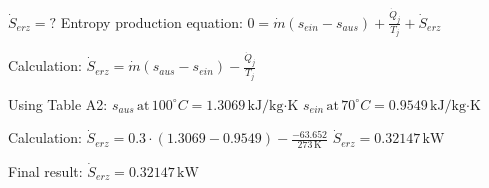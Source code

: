 \( \dot{S}_{erz} = ? \)  
Entropy production equation:  
\( 0 = \dot{m} (s_{ein} - s_{aus}) + \frac{\dot{Q}_j}{T_j} + \dot{S}_{erz} \)  

Calculation:  
\( \dot{S}_{erz} = \dot{m} (s_{aus} - s_{ein}) - \frac{\dot{Q}_j}{T_j} \)  

Using Table A2:  
\( s_{aus} \, \text{at} \, 100^\circ C = 1.3069 \, \text{kJ/kg·K} \)  
\( s_{ein} \, \text{at} \, 70^\circ C = 0.9549 \, \text{kJ/kg·K} \)  

Calculation:  
\( \dot{S}_{erz} = 0.3 \cdot (1.3069 - 0.9549) - \frac{-63.652}{273 \, \text{K}} \)  
\( \dot{S}_{erz} = 0.32147 \, \text{kW} \)  

Final result:  
\( \dot{S}_{erz} = 0.32147 \, \text{kW} \)